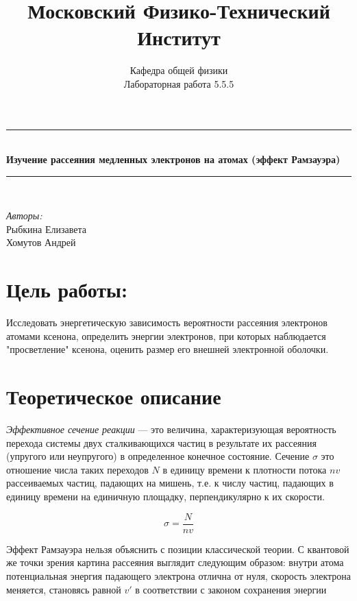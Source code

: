 \documentclass{article}
\title{Московский Физико-Технический Институт}
\author{Кафедра общей физики \\ Лабораторная работа 5.5.5}
\begin{document}
	\maketitle
\thispagestyle{empty}
	\begin{center}
		\rule{\linewidth}{0.5mm} \\[0.4cm]
	{ \Huge\bfseries Изучение рассеяния медленных электронов на атомах (эффект Рамзауэра)\\ [0.4cm] }
		\rule{\linewidth}{0.5mm} \\[0.4cm]
	\end{center}	
\begin{minipage}{0.6\textwidth}
	\begin{flushleft} \large
		\emph{Авторы:}\\
		Рыбкина Елизавета\\
		Хомутов Андрей\\
	\end{flushleft}
\end{minipage}
\begin{center}
\end{center}
\newpage

\section*{Цель работы:}
Исследовать энергетическую зависимость вероятности рассеяния электронов атомами ксенона, определить энергии электронов, при которых наблюдается "просветление" ксенона, оценить размер его внешней электронной оболочки. 


\section*{Теоретическое описание}

\textit{Эффективное сечение реакции} --- это величина, характеризующая вероятность перехода системы двух сталкивающихся частиц в результате их рассеяния (упругого или неупругого) в определенное конечное состояние. Сечение $\sigma$ это отношение числа таких переходов $N$ в единицу времени к плотности потока $nv$ рассеиваемых частиц, падающих на мишень, т.е. к числу частиц, падающих в единицу времени на единичную площадку, перпендикулярно к их скорости.

\begin{equation}
\sigma = \frac{N}{nv}
\end{equation}

Эффект Рамзауэра нельзя объяснить с позиции классической теории. С квантовой же точки зрения картина рассеяния выглядит следующим образом: внутри атома потенциальная энергия падающего электрона отлична от нуля, скорость электрона меняется, становясь равной $v'$ в соответствии с законом сохранения энергии 
\end{document}
